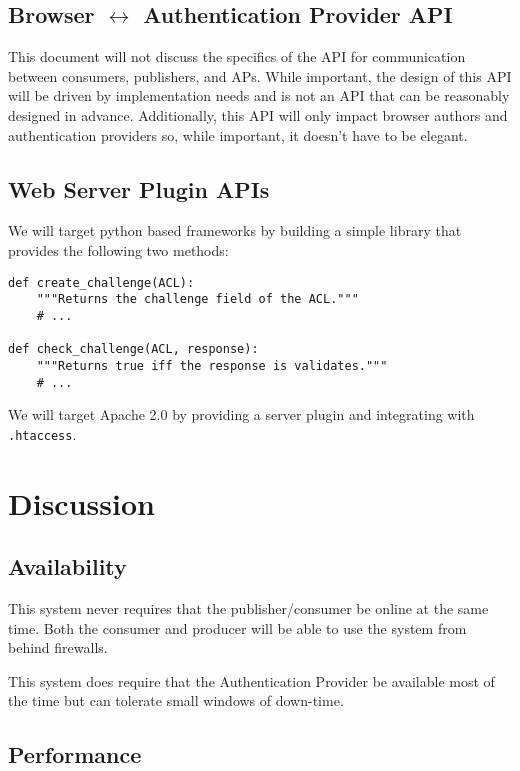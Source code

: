 \documentclass[pdftex,12pt,a4papaer]{article}
\begin{document}
\subsection{Browser $\leftrightarrow$ Authentication Provider API}

This document will not discuss the specifics of the API for communication
between consumers, publishers, and APs. While important, the design of this API
will be driven by implementation needs and is not an API that can be reasonably
designed in advance. Additionally, this API will only impact browser authors and
authentication providers so, while important, it doesn't have to be elegant.

\subsection{Web Server Plugin APIs}

We will target python based frameworks by building a simple library that
provides the following two methods:

\begin{verbatim}
def create_challenge(ACL):
    """Returns the challenge field of the ACL."""
    # ...

def check_challenge(ACL, response):
    """Returns true iff the response is validates."""
    # ...
\end{verbatim}

We will target Apache 2.0 by providing a server plugin and integrating with
\texttt{.htaccess}.

\section{Discussion}

\subsection{Availability}

This system never requires that the publisher/consumer be online at the same
time. Both the consumer and producer will be able to use the system from behind
firewalls.

This system does require that the Authentication Provider be available most of
the time but can tolerate small windows of down-time. %

\subsection{Performance}
\end{document}
